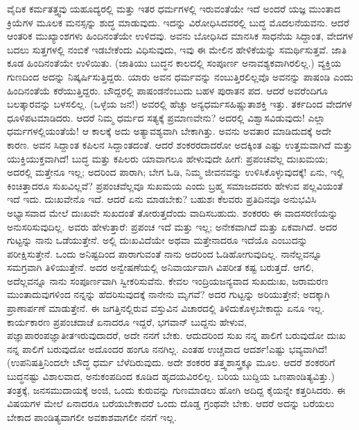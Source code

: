 ವೈದಿಕ ಕರ್ಮತತ್ತ್ವವು ಯಹೂದ್ಯರಲ್ಲಿ ಮತ್ತು ಇತರ ಧರ್ಮಗಳಲ್ಲಿ ಇರುವಂತೆಯೇ ಇದೆ \enginline{-} ಅಂದರೆ ಯಜ್ಞ ಮುಂತಾದ ಕ್ರಿಯೆಗಳ ಮೂಲಕ ಮನಸ್ಸನ್ನು ಶುದ್ಧ ಮಾಡುವುದು. ಇದನ್ನು ವಿರೋಧಿಸಿದವರಲ್ಲಿ ಬುದ್ಧ ಮೊದಲನೆಯವನು. ಆದರೆ ಆಂತರಿಕ ಮುಖ್ಯಾಂಶಗಳು ಹಿಂದಿನಂತೆಯೇ ಉಳಿದವು. ಅವನು ಬೋಧಿಸಿದ ಮಾನಸಿಕ ಸಾಧನೆಯ ಸಿದ್ದಾಂತ, ವೇದಗಳ ಬದಲು ಸುತ್ತಗಳಲ್ಲಿ ನಂಬಿಕೆ ಇಡಬೇಕೆಂದು ವಿಧಿಸುವುದು, ಇವು ಈ ಮೇಲಿನ ಹೇಳಿಕೆಯನ್ನು ಸಮರ್ಥಿಸುತ್ತವೆ. ಜಾತಿ ಕೂಡ ಹಿಂದಿನಂತೆಯೇ ಉಳಿಯಿತು. (ಜಾತಿಯು ಬುದ್ಧನ ಕಾಲದಲ್ಲಿ ಸಂಪೂರ್ಣ ಅನಾವಶ್ಯಕವಾಗಿರಲಿಲ್ಲ.) ವ್ಯಕ್ತಿಯ ಗುಣದಿಂದ ಅದನ್ನು ನಿಷ್ಕರ್ಷಿಸುತ್ತಿದ್ದರು. ಯಾರು ಅವನ ಧರ್ಮವನ್ನು ನಂಬುತ್ತಿರಲಿಲ್ಲವೊ ಅವನನ್ನು ಪಾಷಂಡಿ ಎಂದು ಹಿಂದಿನಂತೆಯೆ ಕರೆಯುತ್ತಿದ್ದರು. ಬೌದ್ದರಲ್ಲಿ ಪಾಷಂಡನೆಂಬುದು ಬಹಳ ಪುರಾತನ ಪದ. ಆದರೆ ಅವರೆಂದಿಗೂ ಬಲತ್ಕಾರವನ್ನು ಬಳಸಲಿಲ್ಲ. (ಒಳ್ಳೆಯ ಜನ!) ಅವರಲ್ಲಿ ಹೆಚ್ಚು ಅನ್ಯಧರ್ಮಸಹಿಷ್ಣುತಾಶಕ್ತಿ ಇತ್ತು. ತರ್ಕದಿಂದ ವೇದಗಳ ಧೂಳಿಪಟಮಾಡಿದರು. ಆದರೆ ನಿಮ್ಮ ಧರ್ಮದ ಸತ್ಯಕ್ಕೆ ಪ್ರಮಾಣವೇನು? ಅದರಲ್ಲಿ ವಿಶ್ವಾಸವಿಡುವುದು! ಎಲ್ಲಾ ಧರ್ಮಗಳಲ್ಲಿಯಂತೆಯೆ! ಆ ಕಾಲಕ್ಕೆ ಅದು ಅತ್ಯಾವಶ್ಯವಾಗಿ ಬೇಕಾಗಿತ್ತು. ಅವನು ಅವತಾರ ಮಾಡಿದುದಕ್ಕೆ ಅದೇ ಕಾರಣ. ಅವನ ಸಿದ್ದಾಂತ ಕಪಿಲನ ಸಿದ್ದಾಂತದಂತೆ. ಆದರೆ ಶಂಕರರದಾದರೋ ಅದಕ್ಕಿಂತ ಎಷ್ಟು ಉತ್ತಮವಾಗಿದೆ ಮತ್ತು ಯುಕ್ತಿಯುಕ್ತವಾಗಿದೆ! ಬುದ್ಧ ಮತ್ತು ಕಪಿಲರು ಯಾವಾಗಲೂ ಹೇಳುವುದೇ ಹೀಗೆ: ಪ್ರಪಂಚವೆಲ್ಲ ದುಃಖಮಯ; ಅದರಲ್ಲಿ ಮತ್ತೇನೂ ಇಲ್ಲ; ಅದರಿಂದ ಪಾರಾಗಿ; ಬೇಗ ಓಡಿ, ನಿಮ್ಮ ಜೀವನವನ್ನು ಉಳಿಸಿಕೊಳ್ಳುವುದಕ್ಕೆ! ಏನು, ಇಲ್ಲಿ ಕಿಂಚಿತ್ತಾದರೂ ಸುಖವಿಲ್ಲವೆ? ಪ್ರಪಂಚವೆಲ್ಲವೂ ಸುಖಮಯ ಎಂದು ಬ್ರಹ್ಮ ಸಮಾಜದವರು ಹೇಳುವ ಪಲ್ಲವಿಯಂತೆ ಇದೆ ಇದು. ದುಃಖವೇನೊ ಇದೆ. ಆದರೆ ಏನು ಮಾಡಬೇಕು? ಬಹುಶಃ ಕೆಲವರು ಪ್ರತಿದಿನವೂ ಅನುಭವಿಸಿ ಅಭ್ಯಾಸವಾದ ಮೇಲೆ ದುಃಖವೇ ಸುಖದಂತೆ ತೋರುತ್ತದೆಂದು ವಾದಿಸಬಹುದು. ಶಂಕರರು ಈ ವಾದಸರಣಿಯನ್ನು ಅನುಸರಿಸುವುದಿಲ್ಲ. ಅವರು ಹೇಳುತ್ತಾರೆ: ಪ್ರಪಂಚ ಇದೆ ಮತ್ತು ಇಲ್ಲ; ಅನೇಕವಾಗಿದೆ ಮತ್ತು ಏಕವಾಗಿದೆ. ಅದರ ಗುಟ್ಟನ್ನು ನಾನು ಒಡೆಯುತ್ತೇನೆ. ಅಲ್ಲಿ ದುಃಖವಿದೆಯೇ ಅಥವಾ ಮತ್ತೇನಾದರೂ ಇದೆಯೊ ಎಂಬುದನ್ನು ಪರೀಕ್ಷಿಸುತ್ತೇನೆ. ಒಂದು ಅನಿಷ್ಟದಿಂದ ಪಾರಾಗುವಂತೆ ನಾನು ಅದರಿಂದ ಓಡಿಹೋಗುವುದಿಲ್ಲ. ನಾನೆಲ್ಲವನ್ನೂ ಸಮಗ್ರವಾಗಿ ತಿಳಿಯುತ್ತೇನೆ. ಅದರ ಅನ್ವೇಷಣೆಯಲ್ಲಿ ಅನಿವಾರ್ಯವಾಗಿ ವಿಪರೀತ ಕಷ್ಟ ಬರುತ್ತದೆ. ಆಗಲಿ, ಅದೆಲ್ಲವನ್ನೂ ನಾನು ಸಂಪೂರ್ಣವಾಗಿ ಸ್ವೀಕರಿಸುವೆನು. ಕೇವಲ ಇಂದ್ರಿಯಜನ್ಯವಾದ ಸುಖ\enginline{-}ದುಃಖ, ಜರಾಮರಣ ಮುಂತಾದುವುಗಳಿಂದ ನನ್ನನ್ನು ಹೆದರಿಸುವುದಕ್ಕೆ ನಾನೇನು ಮೃಗವೆ? ಅದರ ಗುಟ್ಟನ್ನು ಅರಿಯುತ್ತೇನೆ; ಅದಕ್ಕಾಗಿ ಪ್ರಾಣಾರ್ಪಣೆ ಮಾಡುತ್ತೇನೆ. ಈ ಜಗತ್ತಿನಲ್ಲಿರುವ ವಸ್ತುವಿನ ವಿಚಾರದಲ್ಲಿ ತಿಳಿದುಕೊಳ್ಳಬೇಕಾದ್ದು ಏನೂ ಇಲ್ಲ. ಕಾರ್ಯಕಾರಣ ಪ್ರಪಂಚದಾಚೆ ಏನಾದರೂ ಇದ್ದರೆ, ಭಗವಾನ್ ಬುದ್ದನು ಹೇಳುವ, ಪಜ್ಞಾಪಾರಂ\enginline{-}ಪಜ್ಞಾತೀತ\enginline{-}ಇರುವುದಾದರೆ, ಅದೇ ನನಗೆ ಬೇಕು. ಆದುದರಿಂದ ಸುಖ ನನ್ನ ಪಾಲಿಗೆ ಬರುವುದೋ ದುಃಖ ನನ್ನ ಪಾಲಿಗೆ ಬರುವುದೋ ಅದೊಂದರ ಹಂಗೂ ನನಗಿಲ್ಲ. ಎಂತಹ ಉಚ್ಚವಾದ ಆದರ್ಶ!ಎಷ್ಟು ಭವ್ಯವಾಗಿದೆ! (ಉಪನಿಷತ್ತಿನಿಂದಲೇ ಬೌದ್ಧ ಧರ್ಮ ಬೆಳೆದಿರುವುದು. ಅದೇ ಶಂಕರರ ತತ್ತ್ವಶಾಸ್ತ್ರಕ್ಕೂ ಮೂಲ. ಆದರೆ ಶಂಕರರಿಗೆ ಬುದ್ಧನಷ್ಟು ವಿಶಾಲವಾದ, ಅನುಕಂಪದಿಂದ ಕೂಡಿದ ಹೃದಯವಿರಲಿಲ್ಲ. ಬರಿಯ ಬುದ್ದಿಯ ಒಣಪಾಂಡಿತ್ಯವಿತ್ತು.) ತಂತ್ರಕ್ಕೆ, ಜನಸಮುದಾಯಕ್ಕೆ ಅಂಜಿ, ಒಂದು ಕುರುವನ್ನು ಗುಣಮಾಡಲು ಹೋಗಿ ಅದಿದ್ದ ಕೈಯನ್ನೇ ಕತ್ತರಿಸಿದರು. ಈ ವಿಷಯಗಳ ಮೇಲೆ ಏನಾದರೂ ಬರೆಯಬೇಕಾದರೆ ಒಂದು ದೊಡ್ಡ ಗ್ರಂಥವೇ ಬೇಕು. ಆದರೆ ಅದನ್ನು ಬರೆಯಲು ಬೇಕಾದ ಪಾಂಡಿತ್ಯವಾಗಲೀ ಅವಕಾಶವಾಗಲೀ ನನಗೆ ಇಲ್ಲ.

